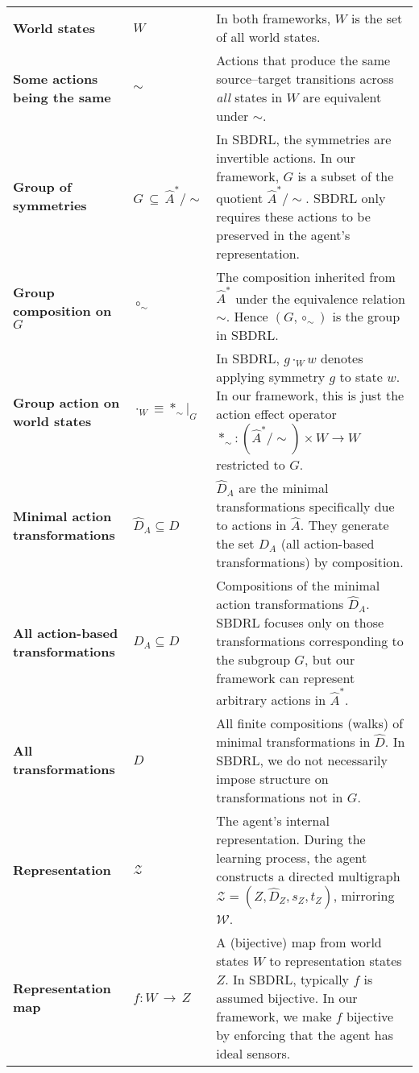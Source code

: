 \begin{longtable}{@{}P{0.24\textwidth} P{0.26\textwidth} Q@{}}
\textbf{World states} & \(W\) & In both frameworks, \(W\) is the set of all world states. \\
\textbf{Some actions being the same} & \(\sim\) & Actions that produce the same source–target transitions across \emph{all} states in \(W\) are equivalent under \(\sim\). \\
\textbf{Group of symmetries} & \(G \,\subseteq\, \hat{A}^{*}/\sim\) & In SBDRL, the symmetries are invertible actions. In our framework, \(G\) is a subset of the quotient \(\hat{A}^{*}/\sim\). SBDRL only requires these actions to be preserved in the agent's representation. \\
\textbf{Group composition on \(G\)} & \(\circ_{\sim}\) & The composition inherited from \(\hat{A}^{*}\) under the equivalence relation \(\sim\). Hence \((G,\circ_{\sim})\) is the group in SBDRL. \\
\textbf{Group action on world states} & \(\cdot_{W} \equiv \ast_{\sim}\! \big\rvert_{G}\) & In SBDRL, \(g \cdot_{W} w\) denotes applying symmetry \(g\) to state \(w\). In our framework, this is just the action effect operator \(\ast_{\sim}: (\hat{A}^{*}/\sim) \times W \to W\) restricted to \(G\). \\
\textbf{Minimal action transformations} & \(\hat{D}_{A}\subseteq D\) & \(\hat{D}_{A}\) are the minimal transformations specifically due to actions in \(\hat{A}\). They generate the set \(D_{A}\) (all action-based transformations) by composition. \\
\textbf{All action-based transformations} & \(D_{A}\subseteq D\) & Compositions of the minimal action transformations \(\hat{D}_{A}\). SBDRL focuses only on those transformations corresponding to the subgroup \(G\), but our framework can represent arbitrary actions in \(\hat{A}^{*}\). \\
\textbf{All transformations} & \(D\) & All finite compositions (walks) of minimal transformations in \(\hat{D}\). In SBDRL, we do not necessarily impose structure on transformations not in \(G\). \\
\textbf{Representation} & \(\mathscr{Z}\) & The agent’s internal representation. During the learning process, the agent constructs a directed multigraph \(\mathscr{Z} = (Z, \hat{D}_{Z}, s_{Z}, t_{Z})\), mirroring \(\mathscr{W}\). \\
\textbf{Representation map} & \(f: W \,\to\, Z\) & A (bijective) map from world states \(W\) to representation states \(Z\). In SBDRL, typically \(f\) is assumed bijective. In our framework, we make \(f\) bijective by enforcing that the agent has ideal sensors. \\

\end{longtable}
